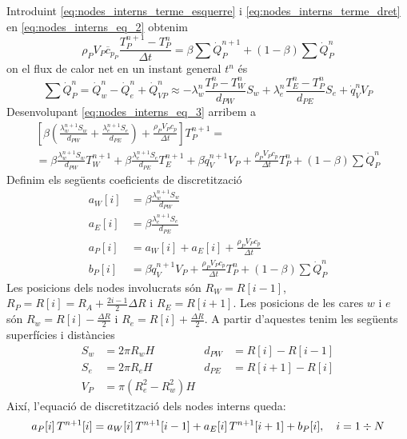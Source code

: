 Introduint \eqref{eq:nodes_interns_terme_esquerre} i \eqref{eq:nodes_interns_terme_dret} en \eqref{eq:nodes_interns_eq_2} obtenim
\begin{equation} \label{eq:nodes_interns_eq_3}
	\rho_P V_P \overline{c}_{p_P} \frac{T_P^{n+1} - T_P^n}{\Delta t} = 
	\beta \sum \dot{Q}_P^{n+1} + (1 - \beta) \sum \dot{Q}_P^n	
\end{equation}
on el flux de calor net en un instant general $t^{n}$ és
\begin{equation} \label{eq:nodes_interns_fluxe_calor}
	\sum \dot{Q}_P^n = \dot{Q}_w^n - \dot{Q}_e^n + \dot{Q}_{VP}^n \approx
	-\lambda_w^n \frac{T_P^n - T_W^n}{d_{PW}} S_w + 
	\lambda_e^n \frac{T_E^n - T_P^n}{d_{PE}} S_e + 
	\dot{q}_V^n V_P
\end{equation}
Desenvolupant \eqref{eq:nodes_interns_eq_3} arribem a
\begin{multline}
	\left[ 
	\beta \left( \frac{\lambda_w^{n+1} S_w}{d_{PW}} + \frac{\lambda_e^{n+1} S_e}{d_{PE}} \right) + 
	\frac{\rho_P V_P c_p}{\Delta t}
	\right] T_P^{n+1} = \\
	= 
	\beta \frac{\lambda_w^{n+1} S_w}{d_{PW}} T_W^{n+1} + 
	\beta \frac{\lambda_e^{n+1} S_e}{d_{PE}} T_E^{n+1} +
	\beta \dot{q}_V^{n+1} V_P + \frac{\rho_P V_P c_p}{\Delta t} T_P^n + (1 - \beta) \sum \dot{Q}_P^n
\end{multline}
Definim els següents coeficients de discretització
\begin{align}
	a_W[i] &= \beta \frac{\lambda_w^{n+1} S_w}{d_{PW}} \\
	a_E[i] &= \beta \frac{\lambda_e^{n+1} S_e}{d_{PE}} \\
	a_P[i] &= a_W[i] + a_E[i] + \frac{\rho_P V_P c_p}{\Delta t} \\
	b_P[i] &= 
	\beta \dot{q}_V^{n+1} V_P + \frac{\rho_P V_P c_p}{\Delta t} T_P^n + (1 - \beta) \sum \dot{Q}_P^n
\end{align}
Les posicions dels nodes involucrats són $R_W = R[i-1]$, $R_P = R[i] = R_A + \frac{2 i - 1}{2} \Delta R$ i $R_E = R[i+1]$. Les posicions de les cares $w$ i $e$ són $R_w = R[i] - \frac{\Delta R}{2}$ i $R_e = R[i] + \frac{\Delta R}{2}$. A partir d'aquestes tenim les següents superfícies i distàncies
\begin{align*}
	S_w &= 2 \pi R_w H & d_{PW} &= R[i] - R[i-1] \\
	S_e &= 2 \pi R_e H & d_{PE} &= R[i+1] - R[i] \\
	V_P &= \pi (R_e^2 - R_w^2) H
\end{align*}
Així, l'equació de discretització dels nodes interns queda:
\begin{equation} \label{eq:discretitzacio_nodes_interns}
	a_P[i] \, T^{n+1}[i] = a_W[i] \, T^{n+1}[i-1] + a_E[i] \, T^{n+1}[i+1] + b_P[i], \quad
	i = 1 \divisionsymbol N
\end{equation}


